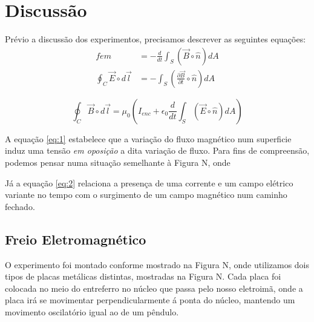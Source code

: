 \documentclass[12pt, a4paper, notitlepage]{article}
\begin{document}
        \section{Discussão}
        
        Prévio a discussão dos experimentos, precisamos descrever as seguintes equações:
        \begin{equation}
            \begin{split}
            fem &= -\frac{d}{dt}\int_{S}(\vec{B}\circ\hat{n})dA \\
            \oint_{C}\vec{E}\circ d\vec{l} &= -\int_{S}(\frac{\partial \vec{B}}{\partial t}\circ\hat{n})dA
            \end{split}\label{eq:1}
        \end{equation}
        
        \begin{equation}\label{eq:2}
            \oint_{C}\vec{B}\circ d\vec{l} = \mu_0(I_{enc} + \epsilon_0 \frac{d}{dt}\int_{S}(\vec{E}\circ\hat{n})dA)
        \end{equation}
        
        A equação \ref{eq:1} estabelece que a variação do fluxo magnético num superficie induz uma tensão \textit{em oposição} a dita variação de fluxo. Para fins de compreensão, podemos pensar numa situação semelhante à Figura N, onde 
        
        Já a equação \ref{eq:2} relaciona a presença de uma corrente e um campo elétrico variante no tempo com o surgimento de um campo magnético num caminho fechado.
        
        \subsection{Freio Eletromagnético}
        
        O experimento foi montado conforme mostrado na Figura N, onde utilizamos dois tipos de placas metálicas distintas, mostradas na Figura N. Cada placa foi colocada no meio do entreferro no núcleo que passa pelo nosso eletroimã, onde a placa irá se movimentar perpendicularmente á ponta do núcleo, mantendo um movimento oscilatório igual ao de um pêndulo.
        
        
\end{document}
